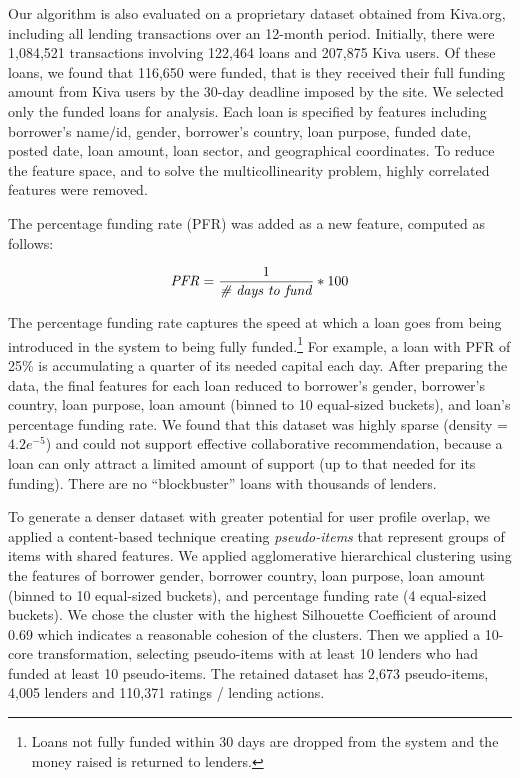Our algorithm is also evaluated on a proprietary dataset obtained from Kiva.org, including all lending transactions over an 12-month period. Initially, there were 1,084,521 transactions involving 122,464 loans and 207,875 Kiva users. Of these loans, we found that 116,650 were funded, that is they received their full funding amount from Kiva users by the 30-day deadline imposed by the site. We selected only the funded loans for analysis. Each loan is specified by features including borrower's name/id, gender, borrower's country, loan purpose, funded date, posted date, loan amount, loan sector, and geographical coordinates. To reduce the feature space, and to solve the multicollinearity problem, highly correlated features were removed. 

The percentage funding rate (PFR) was added as a new feature, computed as follows:

\begin{equation}
 \mbox{\textit{PFR}} =  \frac{1}{\mbox{\textit{{\#} days to fund}}} * 100 
\end{equation}

The percentage funding rate captures the speed at which a loan goes from being introduced in the system to being fully funded.\footnote{Loans not fully funded within 30 days are dropped from the system and the money raised is returned to lenders.} For example, a loan with PFR of 25\% is accumulating a quarter of its needed capital each day. After preparing the data, the final features for each loan reduced to borrower's gender, borrower's country, loan purpose, loan amount (binned to 10 equal-sized buckets), and loan's percentage funding rate. We found that this dataset was highly sparse (density = $4.2e^{-5}$) and could not support effective collaborative recommendation, because a loan can only attract a limited amount of support (up to that needed for its funding). There are no ``blockbuster'' loans with thousands of lenders.

To generate a denser dataset with greater potential for user profile overlap, we applied a content-based technique creating \textit{pseudo-items} that represent groups of items with shared features. We applied agglomerative hierarchical clustering \cite{rokach2005clustering} using the features of borrower gender, borrower country, loan purpose, loan amount (binned to 10 equal-sized buckets), and percentage funding rate (4 equal-sized buckets). We chose the cluster with the highest Silhouette Coefficient \cite{rousseeuw1987silhouettes} of around 0.69 which indicates a reasonable cohesion of the clusters. Then we applied a 10-core transformation, selecting pseudo-items with at least 10 lenders who had funded at least 10 pseudo-items. The retained dataset has 2,673 pseudo-items, 4,005 lenders and 110,371 ratings / lending actions.

